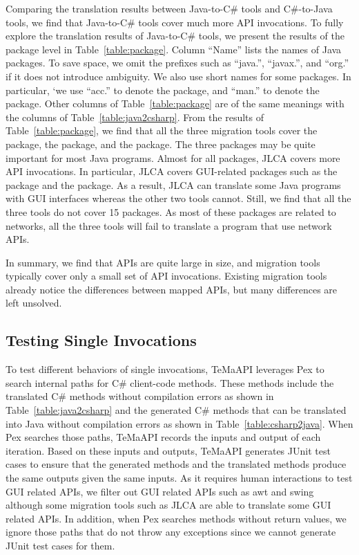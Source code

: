 Comparing the translation results between Java-to-C\# tools and C\#-to-Java tools, we find that Java-to-C\# tools cover much more API invocations. To fully explore the translation results of Java-to-C\# tools, we present the results of the package level in Table~\ref{table:package}. Column ``Name'' lists the names of Java packages. To save space, we omit the prefixes such as ``java.'', ``javax.'', and ``org.'' if it does not introduce ambiguity. We also use short names for some packages. In particular, `we use ``acc.'' to denote the  package, and ``man.'' to denote the  package. Other columns of Table~\ref{table:package} are of the same meanings with the columns of Table~\ref{table:java2csharp}. From the results of Table~\ref{table:package}, we find that all the three migration tools cover the  package, the  package, and the  package. The three packages may be quite important for most Java programs. Almost for all packages, JLCA covers more API invocations. In particular, JLCA covers GUI-related packages such as the  package and the  package. As a result, JLCA can translate some Java programs with GUI interfaces whereas the other two tools cannot. Still, we find that all the three tools do not cover 15 packages. As most of these packages are related to networks, all the three tools will fail to translate a program that use network APIs.


In summary, we find that APIs are quite large in size, and migration tools typically cover only a small set of API invocations. Existing migration tools already notice the differences between mapped APIs, but many differences are left unsolved.
\subsection{Testing Single Invocations}
\label{sec:evaluation:single}


To test different behaviors of single invocations, TeMaAPI leverages Pex to search internal paths for C\# client-code methods. These methods include the translated C\# methods without compilation errors as shown in Table~\ref{table:java2csharp} and the generated C\# methods that can be translated into Java without compilation errors as shown in Table~\ref{table:csharp2java}. When Pex searches those paths, TeMaAPI records the inputs and output of each iteration. Based on these inputs and outputs, TeMaAPI generates JUnit test cases to ensure that the generated methods and the translated methods produce the same outputs given the same inputs. As it requires human interactions to test GUI related APIs, we filter out GUI related APIs such as awt and swing although some migration tools such as JLCA are able to translate some GUI related APIs. In addition, when Pex searches methods without return values, we ignore those paths that do not throw any exceptions since we cannot generate JUnit test cases for them.

